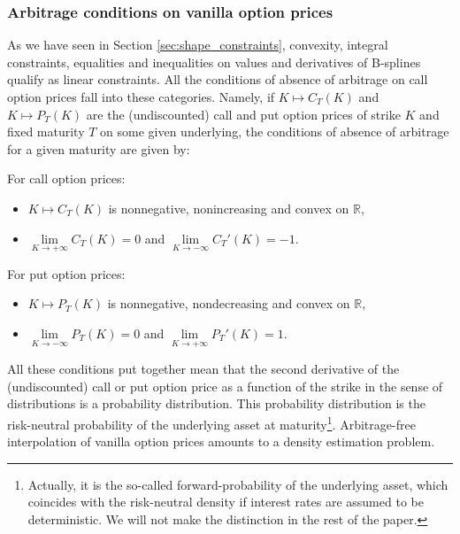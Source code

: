 \documentclass[a4paper]{article}
\newcommand{\1}{\textbf{1}}
\newcommand{\R}{\mathbb{R}}
\begin{document}
\subsubsection*{Arbitrage conditions on vanilla option prices}
\par As we have seen in Section \ref{sec:shape_constraints}, convexity, integral constraints, equalities and inequalities on values and derivatives of B-splines qualify as linear constraints. All the conditions of absence of arbitrage on call option prices fall into these categories. Namely, if $K \mapsto C_T(K)$ and $K \mapsto P_T(K)$ are the (undiscounted) call and put option prices of strike $K$ and fixed maturity $T$ on some given underlying, the conditions of absence of arbitrage for a given maturity are given by:
\vspace{2mm}
\par \noindent \begin{minipage}[c]{0.48\linewidth}
\par For call option prices:
\begin{itemize}
\item $K \mapsto C_T(K)$ is nonnegative, nonincreasing and convex on $\R$,
\item $\lim\limits_{K \to +\infty} C_T(K) = 0$ and $\lim\limits_{K \to -\infty} C_T'(K) = -1$.
\end{itemize}
\end{minipage} \hfill
\begin{minipage}[c]{0.47\linewidth}
\par For put option prices:
\begin{itemize}
\item $K \mapsto P_T(K)$ is nonnegative, nondecreasing and convex on $\R$,
\item $\lim\limits_{K \to -\infty} P_T(K) = 0$ and $\lim\limits_{K \to +\infty} P_T'(K) = 1$.
\end{itemize}
\end{minipage}
\vspace{2mm}
\par All these conditions put together mean that the second derivative of the (undiscounted) call or put option price as a function of the strike in the sense of distributions is a probability distribution. This probability distribution is the risk-neutral probability of the underlying asset at maturity\footnote{Actually, it is the so-called forward-probability of the underlying asset, which coincides with the risk-neutral density if interest rates are assumed to be deterministic. We will not make the distinction in the rest of the paper.}. Arbitrage-free interpolation of vanilla option prices amounts to a density estimation problem. 
\end{document}
